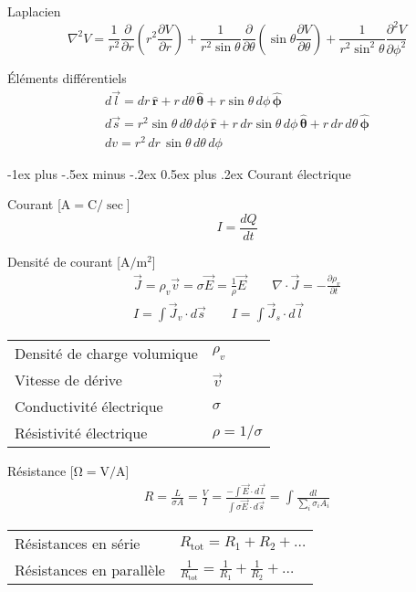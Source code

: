 \documentclass[10pt,landscape]{article}
\makeatletter
\renewcommand{\section}{\@startsection{section}{1}{0mm}%
                                {-1ex plus -.5ex minus -.2ex}%
                                {0.5ex plus .2ex}%
                                {\normalfont\large\bfseries}}
\newcommand{\extraline}{\vspace{1em}}
\newcommand{\tableindent}{\hspace{1.5em}}
\newcommand{\uvec}[1]{\ensuremath{\boldsymbol{\hat{#1}}}}
\makeatother
\begin{document}
\begin{multicols}{3}
Laplacien
\[ \nabla^2 V = \frac{1}{r^2} \frac{\partial}{\partial r}\left( r^2 \frac{\partial V}{\partial r} \right)
+ \frac{1}{r^2\sin\theta}\frac{\partial}{\partial \theta} \left( \sin\theta \frac{\partial V}{\partial\theta} \right)
+ \frac{1}{r^2\sin^2\theta}\frac{\partial^2 V}{\partial \phi^2} \]

Éléments différentiels
\begin{gather*}
d\vec{l} = dr\,\uvec{r} + r\,d\theta\,\uvec{\theta} + r\sin\theta\,d\phi\,\uvec{\phi} \\
d\vec{s} = r^2\sin\theta\,d\theta\,d\phi\,\uvec{r} 
+ r\,dr\sin\theta\,d\phi\,\uvec{\theta}
+ r\,dr\,d\theta\,\uvec{\phi} \\
dv = r^2\,dr\,\sin\theta\,d\theta\,d\phi
\end{gather*}


\hrulefill
\section{Courant électrique}

Courant [$\si{\ampere} = \si{\coulomb/\sec}$]
\[ I = \frac{dQ}{dt} \]

Densité de courant [$\si{\ampere/\metre^2}$]
\begin{gather*}
 \vec{J} = \rho_v \vec{v} = \sigma\vec{E} = \frac{1}{\rho} \vec{E} 
 \qquad
 \nabla\cdot\vec{J} = -\frac{\partial\rho_v}{\partial t}
 \\
 \textstyle
 I =\int \vec{J}_v \cdot d\vec{s} \qquad
 I = \int \vec{J}_s \cdot d\vec{l}
\end{gather*}
%
\begin{tabular}{@{\tableindent}ll@{}}
	Densité de charge volumique & $\rho_v$ \\
	Vitesse de dérive & $\vec{v}$\\
	Conductivité électrique & $\sigma$  \\
	Résistivité électrique  & $\rho = 1/\sigma$ \\
\end{tabular}

\extraline
Résistance [$\si{\ohm} = \si{\volt/\ampere}$]
\begin{gather*}
R = \frac{L}{\sigma A} = \frac{V}{I}
= \frac{-\int \vec{E}\cdot{d\vec{l}}}{\int \sigma\vec{E}\cdot{d\vec{s}}}
= \int\frac{dl}{\sum_i \sigma_i A_i}
\end{gather*}
%
\begin{tabular}{@{\tableindent}ll@{}}
	Résistances en série & $R_\text{tot} = R_1 + R_2 + \dots$ \\
	Résistances en parallèle & $ \frac{1}{R_\text{tot}} = \frac{1}{R_1} + \frac{1}{R_2} + \dots$\\
\end{tabular}


\end{multicols}
\end{document}

